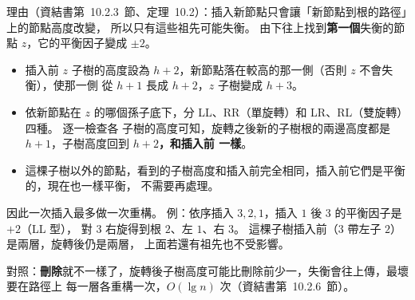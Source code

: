 \begin{pastsoln}
理由（資結書第~10.2.3~節、定理~10.2）：插入新節點只會讓「新節點到根的路徑」上的節點高度改變，
所以只有這些祖先可能失衡。 由下往上找到\textbf{第一個}失衡的節點 $z$，它的平衡因子變成 $\pm 2$。
\begin{itemize}[nosep]
\item 插入前 $z$ 子樹的高度設為 $h + 2$，新節點落在較高的那一側（否則 $z$ 不會失衡），使那一側
從 $h + 1$ 長成 $h + 2$，$z$ 子樹變成 $h + 3$。
\item 依新節點在 $z$ 的哪個孫子底下，分 LL、RR（單旋轉）和 LR、RL（雙旋轉）四種。 逐一檢查各
子樹的高度可知，旋轉之後新的子樹根的兩邊高度都是 $h + 1$，子樹高度回到 \textbf{$h + 2$，和插入前
一樣}。
\item 這棵子樹以外的節點，看到的子樹高度和插入前完全相同，插入前它們是平衡的，現在也一樣平衡，
不需要再處理。
\end{itemize}
因此一次插入最多做一次重構。 例：依序插入 $3, 2, 1$，插入 $1$ 後 $3$ 的平衡因子是 $+2$（LL 型），
對 $3$ 右旋得到根 $2$、左 $1$、右 $3$。 這棵子樹插入前（$3$ 帶左子 $2$）是兩層，旋轉後仍是兩層，
上面若還有祖先也不受影響。

對照：\textbf{刪除}就不一樣了，旋轉後子樹高度可能比刪除前少一，失衡會往上傳，最壞要在路徑上
每一層各重構一次，$O(\lg n)$ 次（資結書第~10.2.6~節）。
\end{pastsoln}
